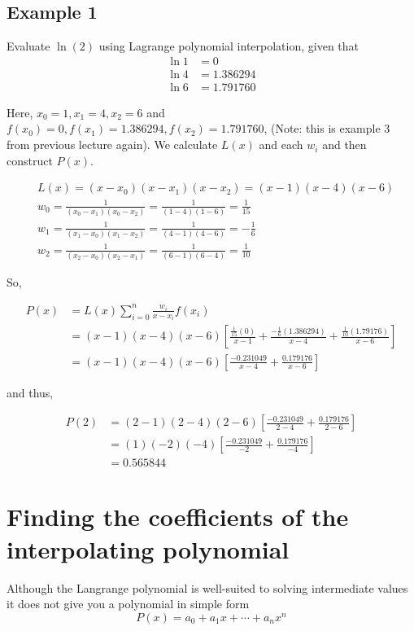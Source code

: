 \documentclass [titlepage,12pt,letter] {article}
\begin{document}
\subsection{Example 1}
Evaluate $\ln(2)$ using Lagrange polynomial interpolation, given that
\begin{align*}
\ln{1} &= 0 \\
\ln 4 &= 1.386294 \\
\ln 6 &= 1.791760
\end{align*}

\noindent
Here, $x_0 = 1, x_1=4, x_2=6$ and $f(x_0)=0, f(x_1)=1.386294, f(x_2)=1.791760$, (Note: this is example 3 from previous lecture again). We calculate $L(x)$ and each $w_i$ and then construct $P(x)$.

\begin{align*}
&L(x)=(x-x_0)(x-x_1)(x-x_2)=(x-1)(x-4)(x-6) \\
&w_0=\frac{1}{(x_0-x_1)(x_0-x_2)}=\frac{1}{(1-4)(1-6)}=\frac{1}{15} \\
&w_1=\frac{1}{(x_1-x_0)(x_1-x_2)}=\frac{1}{(4-1)(4-6)}=-\frac{1}{6} \\
&w_2=\frac{1}{(x_2-x_0)(x_2-x_1)}=\frac{1}{(6-1)(6-4)}=\frac{1}{10}
\end{align*}

So,

\begin{align*}
P(x) &= L(x)\sum_{i=0}^{n} \frac{w_i}{x-x_i} f(x_i) \\
&=(x-1)(x-4)(x-6)\left[\frac{\frac{1}{15}(0)}{x-1}+\frac{-\frac{1}{6}(1.386294)}{x-4}+\frac{\frac{1}{10}(1.79176)}{x-6}\right] \\
&=(x-1)(x-4)(x-6)\left[\frac{-0.231049}{x-4}+\frac{0.179176}{x-6}\right]
\end{align*}

and thus,

\begin{align*}
P(2) &= (2-1)(2-4)(2-6)\left[\frac{-0.231049}{2-4}+\frac{0.179176}{2-6}\right] \\
  &= (1)(-2)(-4)\left[\frac{-0.231049}{-2}+\frac{0.179176}{-4}\right] \\
  &= 0.565844
\end{align*}

\section{Finding the coefficients of the interpolating polynomial} 

Although the Langrange polynomial is well-suited to solving intermediate values it does not give you a polynomial in simple form
\[
P(x) = a_0 + a_1x + \dotsm + a_nx^n
\]
\end{document}
